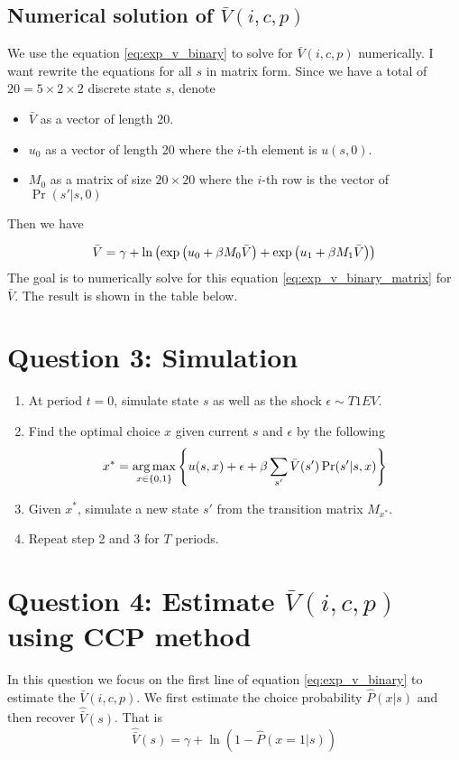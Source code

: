 \documentclass[12pt]{article}[margin=1in]
\begin{document}
\subsection{Numerical solution of $\bar{V}(i,c,p)$}
We use the equation \ref{eq:exp_v_binary} to solve for $\bar{V}(i,c,p)$ numerically.  I want rewrite the equations for all $s$ in matrix form. Since we have a total of $20=5\times 2\times 2$ discrete state $s$, denote
\begin{itemize}
    \item $\bar{V}$ as a vector of length 20.
    \item $u_0$ as a vector of length 20 where the $i$-th element is $u(s,0)$.
    \item $M_0$ as a matrix of size $20 \times 20$ where the $i$-th row is the vector of $\Pr(s'|s,0)$
\end{itemize}
Then we have

\begin{equation}\label{eq:exp_v_binary_matrix}
    \bar{V}= \gamma + \ln\left(\exp\left(u_0 + \beta M_0 \bar{V}\right) + \exp\left(u_1 + \beta M_1 \bar{V}\right)\right)
\end{equation}
The goal is to numerically solve for this equation \ref{eq:exp_v_binary_matrix}
for $\bar{V}$. The result is shown in the table below.
\begin{table} \fontsize{10pt}{12pt}\selectfont
    \centering
    
\end{table}
\section{Question 3: Simulation}
\begin{enumerate}
    \item At period $t=0$, simulate state $s$ as well as the shock $\epsilon \sim T1EV$.
    \item Find the optimal choice $x$ given current $s$ and $\epsilon$ by the following \begin{equation*}
              x^* = \operatorname*{arg\,max}_{x
                  \in \{0,1\}}  \left\{ u(s,x) + \epsilon+ \beta
              \sum_{s'}\bar{V}(s')\Pr(s'|s,x) \right\}
          \end{equation*}
    \item Given $x^*$, simulate a new state $s'$ from the transition matrix $M_{x^*}$.
    \item Repeat step 2 and 3 for $T$ periods.
\end{enumerate}

\section{Question 4: Estimate $\bar{V}(i,c,p)$ using CCP method}
In this question we focus on the first line of equation \ref{eq:exp_v_binary} to estimate the $\bar{V}(i,c,p)$. We first estimate the choice probability $\hat{P}(x|s)$ and then recover $\hat{\bar{V}}(s)$. That is
\begin{equation*}
    \hat{\bar{V}}(s) =  \gamma + \ln (1-\hat{P}(x=1|s))
\end{equation*}
\pagebreak
\newpage
\end{document}
